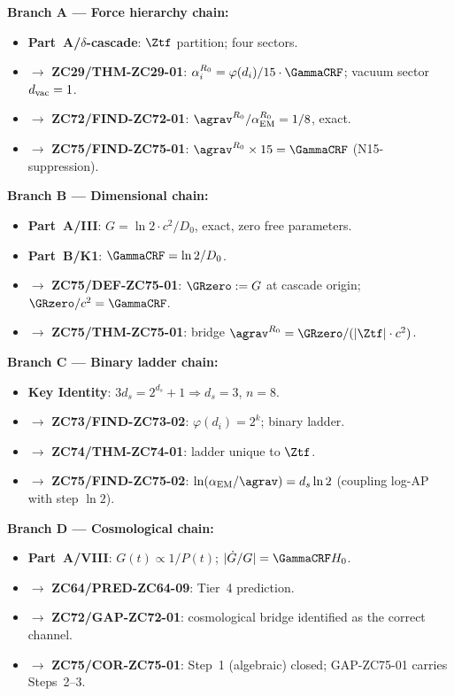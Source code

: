 \documentclass[12pt, a4paper]{article}
\renewcommand{\aEM}{\alpha_{\rm EM}}
\begin{document}
\begin{genealogybox}[title={How ZC75's Key Objects Trace Back}]

\textbf{Branch A --- Force hierarchy chain:}
\begin{itemize}[leftmargin=2em, noitemsep]
  \item \textbf{Part~A/$\delta$-cascade}: $\Ztf$ partition; four sectors.
  \item $\to$ \textbf{ZC29/THM-ZC29-01}: $\alpha_i^{R_0}
    = \varphi(d_i)/15 \cdot \GammaCRF$; vacuum sector $d_{\rm vac}=1$.
  \item $\to$ \textbf{ZC72/FIND-ZC72-01}: $\agrav^{R_0}/\aEM^{R_0}
    = 1/8$, exact.
  \item $\to$ \textbf{ZC75/FIND-ZC75-01}: $\agrav^{R_0} \times 15
    = \GammaCRF$ (N15-suppression).
\end{itemize}

\textbf{Branch B --- Dimensional chain:}
\begin{itemize}[leftmargin=2em, noitemsep]
  \item \textbf{Part~A/III}: $G = \ln2 \cdot c^2/D_0$,
    exact, zero free parameters.
  \item \textbf{Part~B/K1}: $\GammaCRF = \ln2/D_0$.
  \item $\to$ \textbf{ZC75/DEF-ZC75-01}: $\GRzero := G$
    at cascade origin; $\GRzero/c^2 = \GammaCRF$.
  \item $\to$ \textbf{ZC75/THM-ZC75-01}: bridge
    $\agrav^{R_0} = \GRzero/(|\Ztf|\cdot c^2)$.
\end{itemize}

\textbf{Branch C --- Binary ladder chain:}
\begin{itemize}[leftmargin=2em, noitemsep]
  \item \textbf{Key Identity}: $3d_s = 2^{d_s}+1 \Rightarrow
    d_s=3$, $n=8$.
  \item $\to$ \textbf{ZC73/FIND-ZC73-02}: $\varphi(d_i) = 2^k$;
    binary ladder.
  \item $\to$ \textbf{ZC74/THM-ZC74-01}: ladder unique to $\Ztf$.
  \item $\to$ \textbf{ZC75/FIND-ZC75-02}: $\ln(\aEM/\agrav)
    = d_s\ln2$ (coupling log-AP with step $\ln2$).
\end{itemize}

\textbf{Branch D --- Cosmological chain:}
\begin{itemize}[leftmargin=2em, noitemsep]
  \item \textbf{Part~A/VIII}: $G(t) \propto 1/P(t)$;
    $|\dot{G}/G| = \GammaCRF H_0$.
  \item $\to$ \textbf{ZC64/PRED-ZC64-09}: Tier~4 prediction.
  \item $\to$ \textbf{ZC72/GAP-ZC72-01}: cosmological bridge
    identified as the correct channel.
  \item $\to$ \textbf{ZC75/COR-ZC75-01}: Step~1 (algebraic)
    closed; GAP-ZC75-01 carries Steps~2--3.
\end{itemize}


\end{genealogybox}
\end{document}
